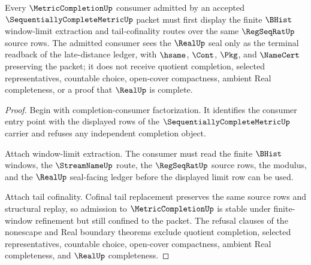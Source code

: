 \begin{theorem}
\label{thm:sequentially-complete-metric-completion-consumer}
Every $\MetricCompletionUp$ consumer admitted by an accepted $\SequentiallyCompleteMetricUp$ packet must first display the finite $\BHist$ window-limit extraction and tail-cofinality routes over the same $\RegSeqRatUp$ source rows. The admitted consumer sees the $\RealUp$ seal only as the terminal readback of the late-distance ledger, with $\hsame$, $\Cont$, $\Pkg$, and $\NameCert$ preserving the packet; it does not receive quotient completion, selected representatives, countable choice, open-cover compactness, ambient Real completeness, or a proof that $\RealUp$ is complete.
\end{theorem}
\begin{proof}
Begin with completion-consumer factorization. It identifies the consumer entry point with the displayed rows of the $\SequentiallyCompleteMetricUp$ carrier and refuses any independent completion object.

Attach window-limit extraction. The consumer must read the finite $\BHist$ windows, the $\StreamNameUp$ route, the $\RegSeqRatUp$ source rows, the modulus, and the $\RealUp$ seal-facing ledger before the displayed limit row can be used.

Attach tail cofinality. Cofinal tail replacement preserves the same source rows and structural replay, so admission to $\MetricCompletionUp$ is stable under finite-window refinement but still confined to the packet. The refusal clauses of the nonescape and Real boundary theorems exclude quotient completion, selected representatives, countable choice, open-cover compactness, ambient Real completeness, and $\RealUp$ completeness.
\end{proof}

